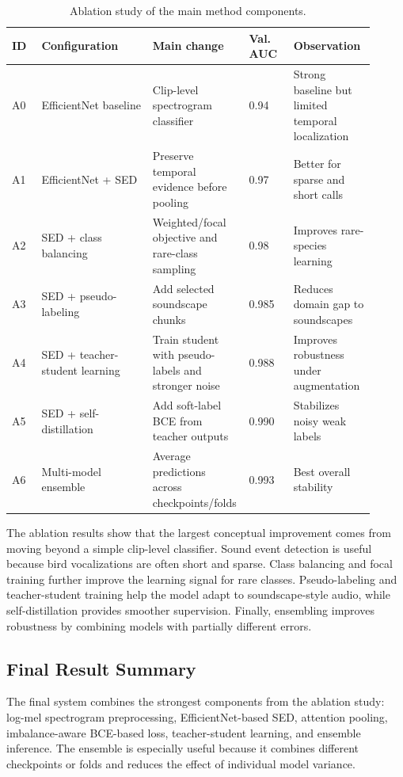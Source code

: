 \documentclass[a4paper,12pt]{article}
\begin{document}
\begin{table}[H]
\centering
\caption{Ablation study of the main method components.}
\begin{tabular}{p{0.08\linewidth} p{0.30\linewidth} p{0.19\linewidth} p{0.12\linewidth} p{0.22\linewidth}}
\toprule
\textbf{ID} & \textbf{Configuration} & \textbf{Main change} & \textbf{Val. AUC} & \textbf{Observation} \\
\midrule
A0 & EfficientNet baseline & Clip-level spectrogram classifier & 0.94 & Strong baseline but limited temporal localization \\
A1 & EfficientNet + SED & Preserve temporal evidence before pooling & 0.97 & Better for sparse and short calls \\
A2 & SED + class balancing & Weighted/focal objective and rare-class sampling & 0.98 & Improves rare-species learning \\
A3 & SED + pseudo-labeling & Add selected soundscape chunks & 0.985 & Reduces domain gap to soundscapes \\
A4 & SED + teacher-student learning & Train student with pseudo-labels and stronger noise & 0.988 & Improves robustness under augmentation \\
A5 & SED + self-distillation & Add soft-label BCE from teacher outputs & 0.990 & Stabilizes noisy weak labels \\
A6 & Multi-model ensemble & Average predictions across checkpoints/folds & 0.993 & Best overall stability \\
\bottomrule
\end{tabular}
\end{table}

The ablation results show that the largest conceptual improvement comes from moving beyond a simple clip-level classifier. Sound event detection is useful because bird vocalizations are often short and sparse. Class balancing and focal training further improve the learning signal for rare classes. Pseudo-labeling and teacher-student training help the model adapt to soundscape-style audio, while self-distillation provides smoother supervision. Finally, ensembling improves robustness by combining models with partially different errors.

\subsection{Final Result Summary}
The final system combines the strongest components from the ablation study: log-mel spectrogram preprocessing, EfficientNet-based SED, attention pooling, imbalance-aware BCE-based loss, teacher-student learning, and ensemble inference. The ensemble is especially useful because it combines different checkpoints or folds and reduces the effect of individual model variance.
\end{document}
